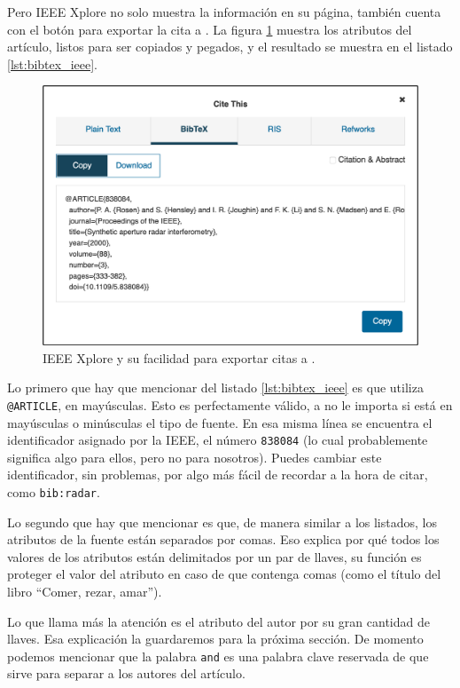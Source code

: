 Pero IEEE Xplore no solo muestra la información en su página, también cuenta con el botón  para exportar la cita a \BibTeX{}. La figura \ref{fig:ieee_xplore_cite} muestra los atributos del artículo, listos para ser copiados y pegados, y el resultado se muestra en el listado \ref{lst:bibtex_ieee}.

\begin{figure}[ht!]
	\centering
	\includegraphics[width=0.70\linewidth]{img/ieee_xplore_cite.png}
	\caption{IEEE Xplore y su facilidad para exportar citas a \BibTeX{}.}
	\label{fig:ieee_xplore_cite}
\end{figure}

Lo primero que hay que mencionar del listado \ref{lst:bibtex_ieee} es que utiliza \texttt{@ARTICLE}, en mayúsculas. Esto es perfectamente válido, a \BibTeX{} no le importa si está en mayúsculas o minúsculas el tipo de fuente. En esa misma línea se encuentra el identificador asignado por la IEEE, el número \texttt{838084} (lo cual probablemente significa algo para ellos, pero no para nosotros). Puedes cambiar este identificador, sin problemas, por algo más fácil de recordar a la hora de citar, como \texttt{bib:radar}.

Lo segundo que hay que mencionar es que, de manera similar a los listados, los atributos de la fuente están separados por comas. Eso explica por qué todos los valores de los atributos están delimitados por un par de llaves, su función es proteger el valor del atributo en caso de que contenga comas (como el título del libro ``Comer, rezar, amar'').

Lo que llama más la atención es el atributo del autor por su gran cantidad de llaves. Esa explicación la guardaremos para la próxima sección. De momento podemos mencionar que la palabra \texttt{and} es una palabra clave reservada de \BibTeX{} que sirve para separar a los autores del artículo.

